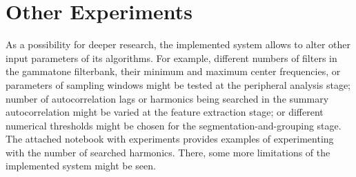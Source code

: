 \section{Other Experiments}

As a possibility for deeper research, the implemented system allows to alter other input parameters of its algorithms. For example, different numbers of filters in the gammatone filterbank, their minimum and maximum center frequencies, or parameters of sampling windows might be tested at the peripheral analysis stage; number of autocorrelation lags or harmonics being searched in the summary autocorrelation might be varied at the feature extraction stage; or different numerical thresholds might be chosen for the segmentation-and-grouping stage. The attached notebook with experiments provides examples of experimenting with the number of searched harmonics. There, some more limitations of the implemented system might be seen.
